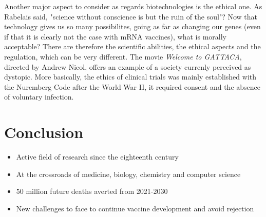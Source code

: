 \documentclass{article}
\begin{document}
        Another major aspect to consider as regards biotechnologies is the ethical one.
        As Rabelais said, "science without conscience is but the ruin of the soul"?
        Now that technology gives us so many possibilites, 
        going as far as changing our genes (even if that it is clearly not the case with mRNA vaccines), what is morally acceptable? 
        There are therefore the scientific abilities, the ethical aspects and the regulation, which can be very different.
        The movie \emph{Welcome to GATTACA}, directed by Andrew Nicol, offers an example of a society currenly perceived as dystopic.
        More basically, the ethics of clinical trials was mainly established with the Nuremberg Code after the World War II,
            it required consent and the absence of voluntary infection.
        





    \section{Conclusion}

    \begin{itemize}
        \item Active field of research since the eighteenth century
        \item At the crossroads of medicine, biology, chemistry and computer science
        \item 50 million future deaths averted from 2021-2030
        \item New challenges to face to continue vaccine development and avoid rejection
    \end{itemize}
\end{document}
